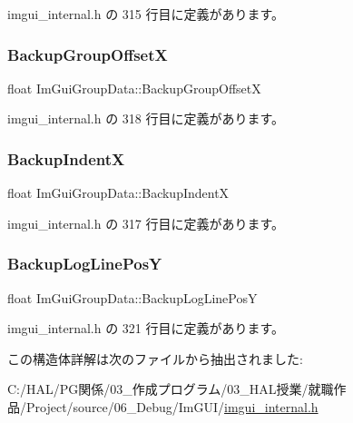  imgui\+\_\+internal.\+h の 315 行目に定義があります。

\mbox{\label{struct_im_gui_group_data_a0cee1b14b574a4bf883ceb1be58a9332}} 
\subsubsection{\texorpdfstring{Backup\+Group\+OffsetX}{BackupGroupOffsetX}}
{\footnotesize\ttfamily float Im\+Gui\+Group\+Data\+::\+Backup\+Group\+OffsetX}



 imgui\+\_\+internal.\+h の 318 行目に定義があります。

\mbox{\label{struct_im_gui_group_data_a9d39092c1c154ba4809ae79e47baeb64}} 
\subsubsection{\texorpdfstring{Backup\+IndentX}{BackupIndentX}}
{\footnotesize\ttfamily float Im\+Gui\+Group\+Data\+::\+Backup\+IndentX}



 imgui\+\_\+internal.\+h の 317 行目に定義があります。

\mbox{\label{struct_im_gui_group_data_af67f52c70f74a3b7bce8ce46affc856b}} 
\subsubsection{\texorpdfstring{Backup\+Log\+Line\+PosY}{BackupLogLinePosY}}
{\footnotesize\ttfamily float Im\+Gui\+Group\+Data\+::\+Backup\+Log\+Line\+PosY}



 imgui\+\_\+internal.\+h の 321 行目に定義があります。



この構造体詳解は次のファイルから抽出されました\+:\begin{DoxyCompactItemize}
\item 
C\+:/\+H\+A\+L/\+P\+G関係/03\+\_\+作成プログラム/03\+\_\+\+H\+A\+L授業/就職作品/\+Project/source/06\+\_\+\+Debug/\+Im\+G\+U\+I/\mbox{\hyperlink{imgui__internal_8h}{imgui\+\_\+internal.\+h}}\end{DoxyCompactItemize}
